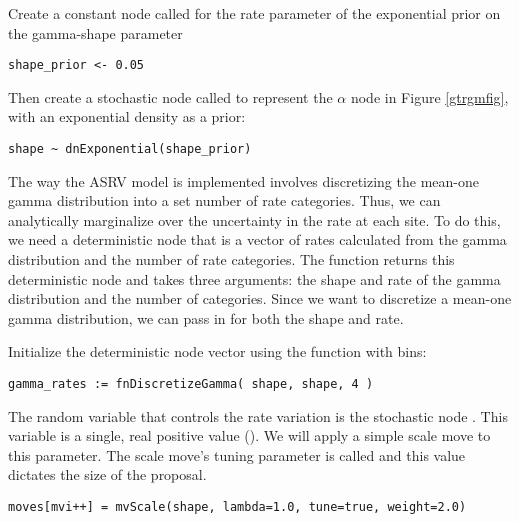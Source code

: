 Create a constant node called  for the rate parameter of the exponential prior on the gamma-shape parameter
{\tt\begin{snugshade*}
\begin{lstlisting}
shape_prior <- 0.05                                                                             
\end{lstlisting}
\end{snugshade*}}

Then create a stochastic node called  to represent the $\alpha$ node in Figure \ref{gtrgmfig}, with an exponential density as a prior:
{\tt\begin{snugshade*}
\begin{lstlisting}
shape ~ dnExponential(shape_prior)

\end{lstlisting}
\end{snugshade*}}

The way the ASRV model is implemented involves discretizing the mean-one gamma distribution into a set number of rate categories. Thus, we can analytically marginalize over the uncertainty in the rate at each site. To do this, we need a deterministic node that is a vector of rates calculated from the gamma distribution and the number of rate categories. The  function returns this deterministic node and takes three arguments: the shape and rate of the gamma distribution and the number of categories. Since we want to discretize a mean-one gamma distribution, we can pass in  for both the shape and rate.

Initialize the  deterministic node vector using the   function with  bins:
{\tt \begin{snugshade*}
\begin{lstlisting}
gamma_rates := fnDiscretizeGamma( shape, shape, 4 )
\end{lstlisting}
\end{snugshade*}}

The random variable that controls the rate variation is the stochastic node . This variable is a single, real positive value (). 
We will apply a simple scale move to this parameter.
The scale move's tuning parameter is called  and this value dictates the size of the proposal.
{\tt \begin{snugshade*}
\begin{lstlisting}
moves[mvi++] = mvScale(shape, lambda=1.0, tune=true, weight=2.0)
\end{lstlisting}
\end{snugshade*}}


